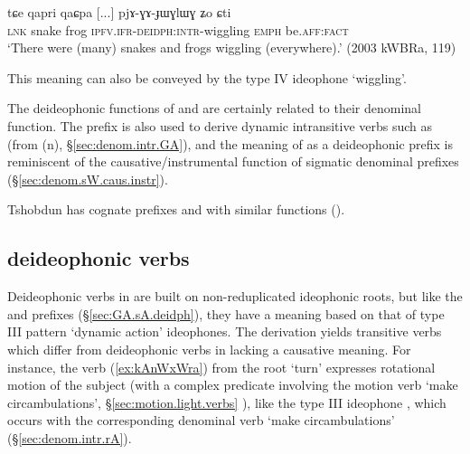 \begin{exe}
\ex \label{ex:pjAGAJWGLWG}
\gll   tɕe qapri qaɕpa [...] pjɤ-ɣɤ-ɟɯɣlɯɣ ʑo ɕti \\
\textsc{lnk} snake frog { } \textsc{ipfv}.\textsc{ifr}-\textsc{deidph}:\textsc{intr}-wiggling \textsc{emph} be.\textsc{aff}:\textsc{fact} \\
\glt `There were (many) snakes and frogs wiggling (everywhere).' (2003 kWBRa, 119)
\end{exe}


This meaning can also be conveyed by the type IV ideophone  `wiggling'.


The deideophonic functions of  and  are certainly related to their denominal function. The prefix  is also used to derive dynamic intransitive verbs such as  (from  (n), §\ref{sec:denom.intr.GA}), and the meaning of  as a deideophonic prefix is reminiscent of the causative/instrumental function of sigmatic denominal prefixes (§\ref{sec:denom.sW.caus.instr}).

Tshobdun has cognate prefixes  and  with similar functions (\citealt{jackson04zhuangmaoci, jackson14morpho}).

\subsection{ deideophonic verbs} \label{sec:nW.deidph}
Deideophonic verbs in  are built on non-reduplicated ideophonic roots, but like the  and  prefixes (§\ref{sec:GA.sA.deidph}), they have a meaning based on that of type III pattern `dynamic action' ideophones. The  derivation yields  transitive verbs which differ from  deideophonic verbs in lacking a causative meaning. For instance, the verb  (\ref{ex:kAnWxWra}) from the root  `turn' expresses rotational motion of the subject (with a complex predicate involving the motion verb  `make circambulations', §\ref{sec:motion.light.verbs}
), like the type III ideophone , which occurs with the corresponding denominal verb  `make circambulations' (§\ref{sec:denom.intr.rA}).

